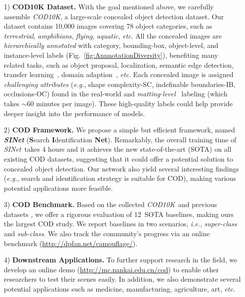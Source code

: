 \documentclass[10pt,journal,compsoc]{IEEEtran}
\def\ie{\emph{i.e.}}
\def\eg{\emph{e.g.}}
\def\etc{\emph{etc}}
\newcommand{\sArt}{state-of-the-art }
\newcommand{\figref}[1]{Fig.~\ref{#1}}
\newcommand{\Rev}[1]{\textcolor{black}{#1}}
\def\ourdataset{\textit{COD10K}}
\def\ournewmodel{\emph{SINet}}
\def\baselineN{12}
\begin{document}
\begin{itemize}

\item [1)] \textbf{COD10K Dataset.} 
With the goal mentioned above, we carefully assemble \ourdataset, 
a large-scale concealed object detection dataset. 
Our dataset contains 10,000 images covering 78 object categories, such as 
\emph{terrestrial}, \emph{amphibians}, \emph{flying}, \emph{aquatic}, \etc. 
%
All the concealed images are \emph{hierarchically annotated} with category, 
bounding-box, object-level, 
and instance-level labels (\figref{fig:AnnnotationDiversity}), 
benefiting many related tasks, such as object proposal, localization, 
semantic edge detection, 
transfer learning~\cite{zamir2018taskonomy}, 
domain adaption~\cite{saenko2010adapting}, \etc.
%
Each concealed image is assigned \emph{challenging attributes} 
(\eg, shape complexity-SC, indefinable boundaries-IB, occlusions-OC) 
found in the real-world and \emph{matting-level}~\cite{zhang2019late} 
labeling (which takes $\sim$60 minutes per image).
%
These high-quality labels could help provide deeper insight into 
the performance of models.

\item [2)] \textbf{COD Framework.} 
We propose a simple but efficient framework, named \textbf{\ournewmodel}
(\textbf{S}earch \textbf{I}dentification \textbf{Net}).
%
Remarkably, the overall training time of \ournewmodel~takes 4 hours and 
it achieves the new \sArt (SOTA) on all existing COD datasets, suggesting 
that it could offer a potential solution to concealed object detection. 
Our network also yield several interesting findings 
(\eg, search and identification strategy is suitable for COD), 
making various potential applications more feasible. 

\item [3)] \textbf{COD Benchmark.} 
Based on the collected \ourdataset~and previous datasets
\cite{2018Animal,le2019anabranch}, 
we offer a rigorous evaluation of \baselineN~SOTA baselines,
making ours the largest COD study. 
We report baselines in two scenarios, \ie, \textit{super-class} and 
\textit{sub-class}. 
We also track the community's progress via an online benchmark (\Rev{\url{http://dpfan.net/camouflage/}}). 

\item [4)] \textbf{Downstream Applications.} 
To further support research in the field, 
we develop an online demo (\url{http://mc.nankai.edu.cn/cod}) to enable other researchers to test 
their scenes easily. 
In addition, we also demonstrate several potential applications 
such as medicine, manufacturing, agriculture, art, \etc.


\end{itemize}
\end{document}
